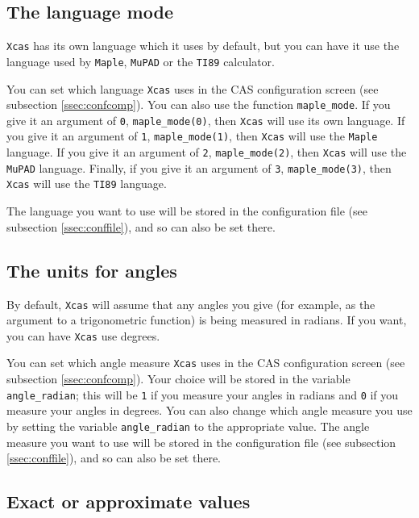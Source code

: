 \documentclass[a4paper,11pt]{book}
\begin{document}
\subsection{The language mode}
\label{ssec:lang}

\texttt{Xcas} has its own language which it uses by default, but you
can have it use the language used by \texttt{Maple}, \texttt{MuPAD} or
the \texttt{TI89} calculator.

You can set which language \texttt{Xcas} uses in the CAS configuration
screen (see subsection \ref{ssec:confcomp}).  You can also use the
function \texttt{maple\_mode}.  If 
you give it an argument of \texttt{0}, \texttt{maple\_mode(0)}, then
\texttt{Xcas} will use its own language.  If you give it an argument
of \texttt{1}, \texttt{maple\_mode(1)}, then \texttt{Xcas} will use the
\texttt{Maple} language.  If you give it an argument of \texttt{2},
\texttt{maple\_mode(2)}, then \texttt{Xcas} will use the \texttt{MuPAD}
language.  Finally, if you give it an argument of \texttt{3},
\texttt{maple\_mode(3)}, then \texttt{Xcas} will use the \texttt{TI89}
language.  
			   
The language you want to use will be stored in the configuration file
(see subsection \ref{ssec:conffile}), and so can also be set there.

\subsection{The units for angles}
\label{ssec:angles}

By default, \texttt{Xcas} will assume that any angles you give (for
example, as the argument to a trigonometric function) is being
measured in radians.  If you want, you can have \texttt{Xcas} use
degrees.

You can set which angle measure \texttt{Xcas} uses in the CAS
configuration screen (see subsection \ref{ssec:confcomp}).  
Your choice will be stored in the variable
\texttt{angle\_radian}; this will be \texttt{1} if you measure your
angles in radians and \texttt{0} if you measure your angles in
degrees.  You can also change which angle measure you use by setting
the variable \texttt{angle\_radian} to the appropriate value.  The
angle measure you want to use will be stored in the configuration file
(see subsection \ref{ssec:conffile}), and so can also be set there.

\subsection{Exact or approximate values}
\label{ssec:approx}
\end{document}
